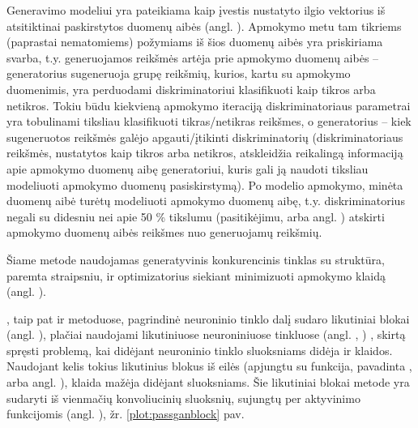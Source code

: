 \documentclass{VUMIFInfBakalaurinis}
\begin{document}
Generavimo modeliui yra pateikiama kaip įvestis nustatyto ilgio vektorius iš 
atsitiktinai paskirstytos duomenų aibės (angl. ). Apmokymo metu tam tikriems (paprastai nematomiems) požymiams iš 
šios duomenų aibės yra priskiriama svarba, t.y. generuojamos reikšmės artėja 
prie apmokymo duomenų aibės -- generatorius sugeneruoja grupę reikšmių, kurios, 
kartu su apmokymo duomenimis, yra perduodami diskriminatoriui klasifikuoti kaip 
tikros arba netikros. Tokiu būdu kiekvieną apmokymo iteraciją diskriminatoriaus 
parametrai yra tobulinami tiksliau klasifikuoti tikras/netikras reikšmes, o 
generatorius -- kiek sugeneruotos reikšmės galėjo apgauti/įtikinti 
diskriminatorių (diskriminatoriaus reikšmės, nustatytos kaip tikros arba 
netikros, atskleidžia reikalingą informaciją apie apmokymo duomenų aibę 
generatoriui, kuris gali ją naudoti tiksliau modeliuoti apmokymo duomenų 
pasiskirstymą). Po modelio apmokymo, minėta duomenų aibė turėtų modeliuoti 
apmokymo duomenų aibę, t.y. diskriminatorius negali su didesniu nei apie 50 \% 
tikslumu (pasitikėjimu, arba angl. ) atskirti apmokymo 
duomenų aibės reikšmes nuo generuojamų reikšmių.

Šiame metode naudojamas generatyvinis konkurencinis tinklas su struktūra, 
paremta  \cite{GAN} straipsniu, ir  
optimizatorius \cite{ADAM} siekiant minimizuoti apmokymo klaidą (angl. 
).

, taip pat ir  metoduose, pagrindinė 
neuroninio tinklo dalį sudaro likutiniai blokai (angl. ), plačiai naudojami likutiniuose neuroniniuose tinkluose (angl. 
, ) \cite{ResNet}, skirtą 
spręsti problemą, kai didėjant neuroninio tinklo sluoksniams didėja ir klaidos. 
Naudojant kelis tokius likutinius blokus iš eilės (apjungtu su funkcija, 
pavadinta , arba angl. ), klaida mažėja didėjant sluoksniams. Šie likutiniai blokai 
 metode yra sudaryti iš vienmačių konvoliucinių sluoksnių, 
sujungtų per  aktyvinimo funkcijomis (angl. 
), žr. \ref{plot:passganblock} pav.
\end{document}
